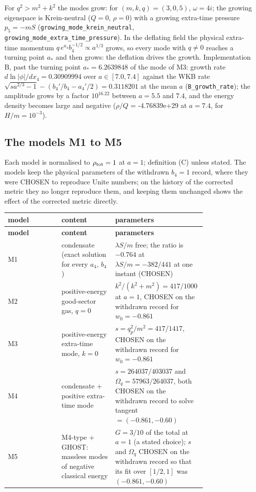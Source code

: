 \documentclass[11pt]{article}
\begin{document}
For $q^2 > m^2 + k^2$ the modes grow: for $(m, k, q) = (3, 0, 5)$, $\omega = 4i$; the growing eigenspace is Krein-neutral ($Q = 0$, $\rho = 0$) with a growing extra-time pressure $p_5 = -mS$ (\texttt{growing\_\allowbreak{}mode\_kre\allowbreak{}in\_neutr\allowbreak{}al}, \texttt{growing\_\allowbreak{}mode\_ext\allowbreak{}ra\_time\_\allowbreak{}pressure}). In the deflating field the physical extra-time momentum $q\,e^{a_4}b_4^{-1/2} \propto a^{1/3}$ grows, so every mode with $q \neq 0$ reaches a turning point $a_*$ and then grows: the deflation drives the growth. Implementation B, past the turning point $a_* = 6.2639848$ of the mode of M3: growth rate $d\ln|\phi|/dx_4 = 0.30909994$ over $a \in [7.0, 7.4]$ against the WKB rate $\sqrt{sa^{2/3} - 1} - (b_4'/b_4 - a_4'/2) = 0.3118201$ at the mean $a$ (\texttt{B\_growth\allowbreak{}\_rate}); the amplitude grows by a factor $10^{16.22}$ between $a = 5.5$ and $7.4$, and the energy density becomes large and negative ($\rho/Q$ = -4.76839e+29 at $a = 7.4$, for $H/m = 10^{-3}$).

\subsection{The models M1 to M5}

Each model is normalised to $\rho_{\rm tot} = 1$ at $a = 1$; definition (C) unless stated. The models keep the physical parameters of the withdrawn $b_4 = 1$ record, where they were CHOSEN to reproduce Unite numbers; on the history of the corrected metric they no longer reproduce them, and keeping them unchanged shows the effect of the corrected metric directly.

\begingroup
\small
\begin{longtable}{@{}>{\raggedright\arraybackslash}p{0.267\linewidth}>{\raggedright\arraybackslash}p{0.267\linewidth}>{\raggedright\arraybackslash}p{0.267\linewidth}@{}}
\toprule
\textbf{model} & \textbf{content} & \textbf{parameters} \\
\midrule
\endfirsthead
\toprule
\textbf{model} & \textbf{content} & \textbf{parameters} \\
\midrule
\endhead
M1 & condensate (exact solution for every $a_4$, $b_4$) & $\lambda S/m$ free; the ratio is $-0.764$ at $\lambda S/m = -382/441$ at one instant (CHOSEN) \\
M2 & positive-energy good-sector gas, $q = 0$ & $k^2/(k^2+m^2) = 417/1000$ at $a = 1$, CHOSEN on the withdrawn record for $w_0 = -0.861$ \\
M3 & positive-energy extra-time mode, $k = 0$ & $s = q_p^2/m^2 = 417/1417$, CHOSEN on the withdrawn record for $w_0 = -0.861$ \\
M4 & condensate + positive extra-time mode & $s = 264037/403037$ and $\Omega_q = 57963/264037$, both CHOSEN on the withdrawn record to solve tangent $= (-0.861, -0.60)$ \\
M5 & M4-type + GHOST: massless modes of negative classical energy & $G = 3/10$ of the total at $a = 1$ (a stated choice); $s$ and $\Omega_q$ CHOSEN on the withdrawn record so that its fit over $[1/2, 1]$ was $(-0.861, -0.60)$ \\
\bottomrule
\end{longtable}
\endgroup
\end{document}
